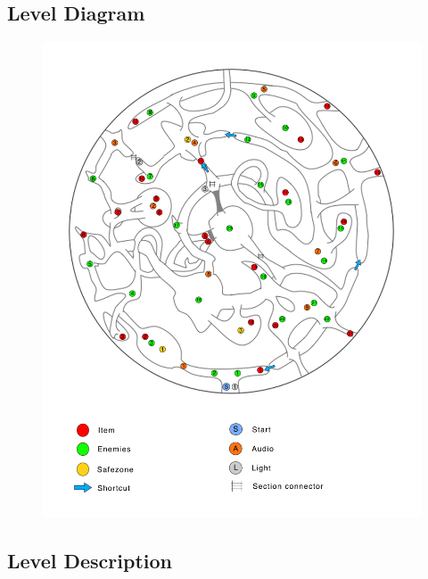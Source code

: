 \subsection{Level Diagram}
\begin{figure}[H]
	\centering
	\includegraphics[width=0.95\linewidth]{images/map/map_legend.png}
\end{figure}
\newpage

\subsection{Level Description}

